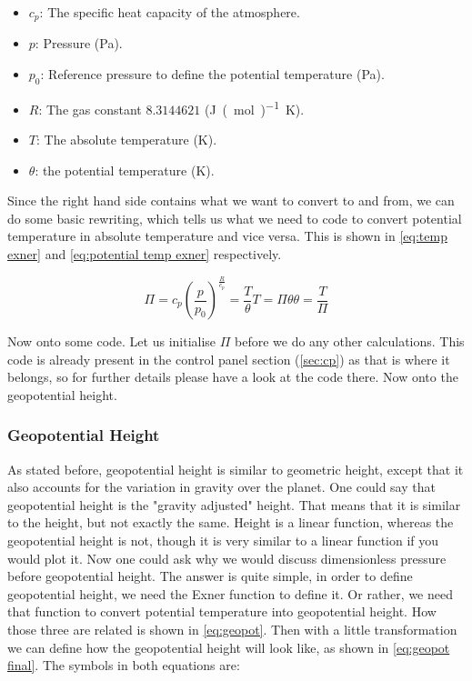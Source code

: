 \begin{itemize}
    \item $c_p$: The specific heat capacity of the atmosphere.
    \item $p$: Pressure (\si{Pa}).
    \item $p_0$: Reference pressure to define the potential temperature (\si{Pa}).
    \item $R$: The gas constant $8.3144621$ (\si{J(mol)^{-1}K}).
    \item $T$: The absolute temperature (\si{K}).
    \item $\theta$: the potential temperature (\si{K}).
\end{itemize}

Since the right hand side contains what we want to convert to and from, we can do some basic rewriting, which tells us what we need to code to convert potential temperature in absolute 
temperature and vice versa. This is shown in \autoref{eq:temp exner} and \autoref{eq:potential temp exner} respectively.

\begin{subequations}
    \begin{equation}
        \Pi = c_p(\frac{p}{p_0})^{\frac{R}{c_p}} = \frac{T}{\theta}
        \label{eq:exner}
    \end{equation}
    \begin{equation}
        T = \Pi\theta
        \label{eq:temp exner}
    \end{equation}
    \begin{equation}
        \theta = \frac{T}{\Pi}
        \label{eq:potential temp exner}
    \end{equation}
\end{subequations}

Now onto some code. Let us initialise $\Pi$ before we do any other calculations. This code is already present in the control panel section (\autoref{sec:cp}) as that is where it belongs, so for 
further details please have a look at the code there. Now onto the geopotential height. 

\subsubsection{Geopotential Height}
As stated before, geopotential height is similar to geometric height, except that it also accounts for the variation in gravity over the planet. One could say that geopotential height is the 
"gravity adjusted" height. That means that it is similar to the height, but not exactly the same. Height is a linear function, whereas the geopotential height is not, though it is very similar 
to a linear function if you would plot it. Now one could ask why we would discuss dimensionless pressure before geopotential height. The answer is quite simple, in order to define geopotential 
height, we need the Exner function to define it. Or rather, we need that function to convert potential temperature into geopotential height. How those three are related is shown in 
\autoref{eq:geopot}. Then with a little transformation we can define how the geopotential height will look like, as shown in \autoref{eq:geopot final}. The symbols in both equations are:

